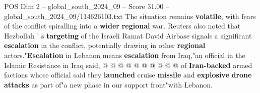 \begin{textsample}{POS Dim 2 – global\_south\_2024\_09 – Score 31.00 – global\_south\_2024\_09/114626103.txt}
The situation remains \textbf{volatile}, with fears of the conflict spiralling into a \textbf{wider} \textbf{regional} war.
Reuters also noted that Hezbollah ' s \textbf{targeting} of the Israeli Ramat David Airbase signals a significant \textbf{escalation} in the conflict, potentially drawing in other \textbf{regional} actors."\textbf{Escalation} in Lebanon means \textbf{escalation} from Iraq,"an official in the Islamic Resistance in Iraq said, @ @ @ @ @ @ @ @ @ @ of \textbf{Iran-backed} armed factions whose official said they \textbf{launched} cruise \textbf{missile} and \textbf{explosive} \textbf{drone} \textbf{attacks} as part of"a new phase in our support front"with Lebanon.

\end{textsample}
